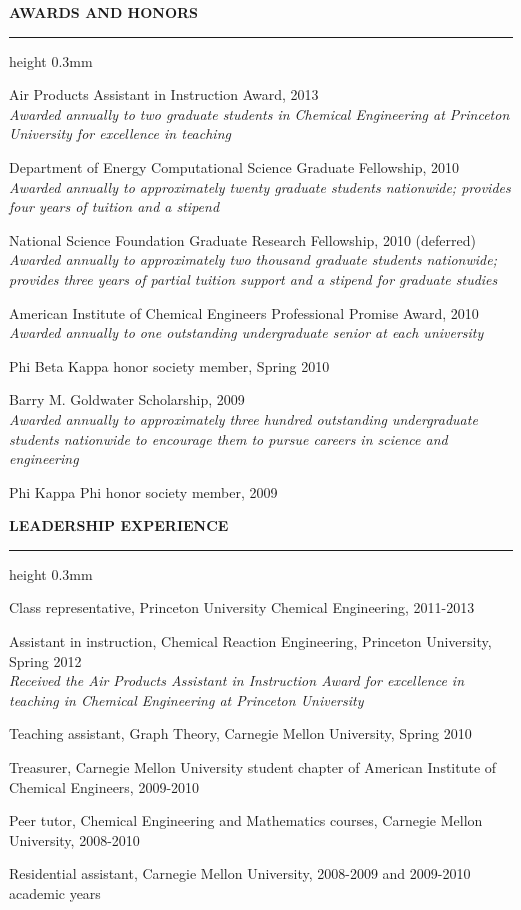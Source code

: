 \documentclass[letterpaper,10pt]{article}
\newenvironment{itemize*}
  {\begin{itemize}
    \setlength{\parskip}{-2pt}}
  {\end{itemize}}
\newcommand{\cvheading}[1]{
\vspace{0.11in}
\noindent
\MakeUppercase{\bf #1}
\vspace{0.06in}
{\hrule height 0.3mm}
\vspace{0.06in}}
\begin{document}
\cvheading{Awards and Honors}
\noindent
\begin{itemize*}
\item Air Products Assistant in Instruction Award, 2013\\
    {\em \small Awarded annually to two graduate students in Chemical Engineering at Princeton University for excellence in teaching}
\item Department of Energy Computational Science Graduate Fellowship, 2010 \\
    {\em \small Awarded annually to approximately twenty graduate students nationwide; provides four years of tuition and a stipend}
\item National Science Foundation Graduate Research Fellowship, 2010 (deferred)\\
    {\em \small Awarded annually to approximately two thousand graduate students nationwide; provides three years of partial tuition support and a stipend for graduate studies}
\item American Institute of Chemical Engineers Professional Promise Award, 2010\\
    {\em \small Awarded annually to one outstanding undergraduate senior at each university}
\item Phi Beta Kappa honor society member, Spring 2010
\item Barry M. Goldwater Scholarship, 2009\\
    {\em \small Awarded annually to approximately three hundred outstanding undergraduate students nationwide to encourage them to pursue careers in science and engineering}
\item Phi Kappa Phi honor society member, 2009
\end{itemize*}

\cvheading{Leadership Experience}
\begin{itemize*}
\item Class representative, Princeton University Chemical Engineering, 2011-2013
\item Assistant in instruction, Chemical Reaction Engineering, Princeton University, Spring 2012  \\
{\em \small Received the Air Products Assistant in Instruction Award for excellence in teaching in Chemical Engineering at Princeton University}
\item Teaching assistant, Graph Theory, Carnegie Mellon University, Spring 2010
\item Treasurer, Carnegie Mellon University student chapter of American Institute of Chemical Engineers, 2009-2010
\item Peer tutor, Chemical Engineering and Mathematics courses, Carnegie Mellon University, 2008-2010
\item Residential assistant, Carnegie Mellon University, 2008-2009 and 2009-2010 academic years
\end{itemize*}
\end{document}
